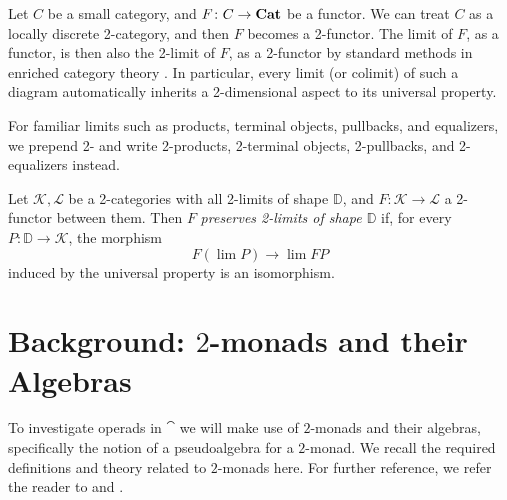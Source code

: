 \begin{rem}\label{rem:lim-v-2lim}
Let $C$ be a small category, and $F \colon C \to \mathbf{Cat}$ be a functor.
We can treat $C$ as a locally discrete 2-category, and then $F$ becomes a 2-functor.
The limit of $F$, as a functor, is then also the 2-limit of $F$, as a 2-functor by standard methods in enriched category theory \cite[Section 3.8]{Kelly2005}. In particular, every limit (or colimit) of such a diagram automatically inherits a 2-dimensional aspect to its universal property.
\end{rem}

\begin{conv}\label{conv:name-2lim}
For familiar limits such as products, terminal objects, pullbacks, and equalizers, we prepend 2- and write 2-products, 2-terminal objects, 2-pullbacks, and 2-equalizers instead. 
\end{conv}

\begin{Defi}\label{Defi:preserve-2lim}
Let $\mathcal{K}, \mathcal{L}$ be a 2-categories with all 2-limits of shape $\mathbb{D}$, and $F \colon \mathcal{K} \to \mathcal{L}$ a 2-functor between them. Then $F$ \emph{preserves 2-limits of shape $\mathbb{D}$} if, for every $P \colon \mathbb{D} \to \mathcal{K}$, the morphism
\[
F(\lim P) \to \lim FP
\]
induced by the universal property is an isomorphism.
\end{Defi}


\section{Background: $2$-monads and their Algebras}\label{sec:2monads}

To investigate operads in $\cat$ we will make use of $2$-monads and their algebras, specifically the notion of a pseudoalgebra for a $2$-monad. We recall the required definitions and theory related to $2$-monads here. For further reference, we refer the reader to \cite{BKP} and \cite{power-gen}.

